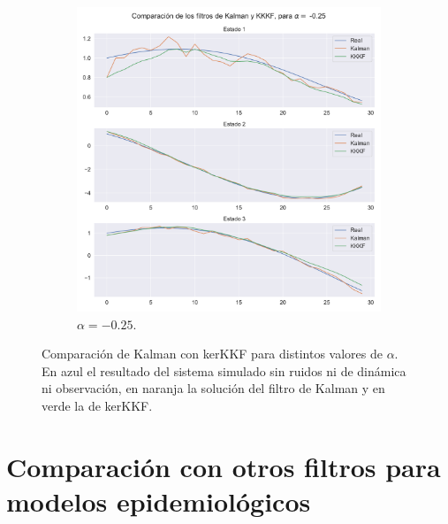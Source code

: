 \begin{figure}[h!]
\begin{subfigure}[b]{0.49\textwidth}
        \centering \includegraphics[width=0.75\linewidth]{img/content/chapter4/kalman_vs_kerKKF_025.pdf}
    \caption{$\alpha = -0.25$.}
    \label{fig:kalman_vs_kerKKF_025}
    \end{subfigure}
    \caption{Comparación de Kalman con kerKKF para distintos valores de $\alpha$. En azul el resultado del sistema simulado sin ruidos ni de dinámica ni observación, en naranja la solución del filtro de Kalman y en verde la de kerKKF.}
\end{figure}

\section{Comparación con otros filtros para modelos epidemiológicos}

